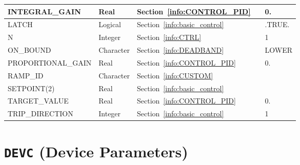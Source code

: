 \documentclass[11pt]{book}
\begin{document}
\begin{longtable}{@{\extracolsep{\fill}}|l|l|l|l|l|}
{\ct INTEGRAL\_GAIN}     & Real        & Section~\ref{info:CONTROL_PID}          &    &  0.                    \\ \hline
{\ct LATCH}              & Logical     & Section~\ref{info:basic_control}        &    & {\ct .TRUE.}           \\ \hline
{\ct N}                  & Integer     & Section~\ref{info:CTRL}                 &    &   1                    \\ \hline
{\ct ON\_BOUND}          & Character   & Section~\ref{info:DEADBAND}             &    & {\ct LOWER}            \\ \hline
{\ct PROPORTIONAL\_GAIN} & Real        & Section~\ref{info:CONTROL_PID}          &    &  0.                    \\ \hline
{\ct RAMP\_ID}           & Character   & Section~\ref{info:CUSTOM}               &    &                        \\ \hline
{\ct SETPOINT(2)}        & Real        & Section~\ref{info:basic_control}        &    &                        \\ \hline
{\ct TARGET\_VALUE}      & Real        & Section~\ref{info:CONTROL_PID}          &    &  0.                    \\ \hline
{\ct TRIP\_DIRECTION}    & Integer     & Section~\ref{info:basic_control}        &    &   1                    \\ \hline
\end{longtable}


\vspace{\baselineskip}


\section{\texorpdfstring{{\tt DEVC}}{DEVC} (Device Parameters)}
\end{document}
